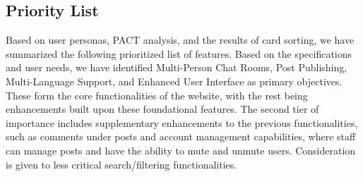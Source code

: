 \documentclass[12pt]{article}
\begin{document}
\subsection{Priority List}
    Based on user personas, PACT analysis, and the results of card sorting, we have summarized the following prioritized list of features. Based on the specifications and user needs, we have identified Multi-Person Chat Rooms, Post Publishing, Multi-Language Support, and Enhanced User Interface as primary objectives. These form the core functionalities of the website, with the rest being enhancements built upon these foundational features. The second tier of importance includes supplementary enhancements to the previous functionalities, such as comments under posts and account management capabilities, where staff can manage posts and have the ability to mute and unmute users. Consideration is given to less critical search/filtering functionalities.
\end{document}
